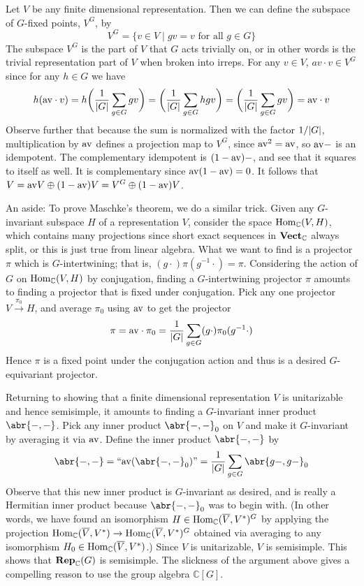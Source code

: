 \documentclass[../../rtnotes.tex]{subfiles}
\begin{document}
Let $V$ be any finite dimensional representation. Then we can define the subspace of $G$-fixed points, $V^G$, by
\[V^G = \{v\in V\mid gv = v\text{ for all }g\in G\}\]
The subspace $V^G$ is the part of $V$ that $G$ acts trivially on, or in other words is the trivial representation part of $V$ when broken into irreps. For any $v\in V$, $av\cdot v\in V^G$ since for any $h\in G$ we have
\[h(\mathrm{av}\cdot v) = h\biggl(\frac{1}{\abs{G}}\sum_{g\in G}gv\biggr) = \biggl(\frac{1}{\abs{G}}\sum_{g\in G}hgv\biggr) = \biggl(\frac{1}{\abs{G}}\sum_{g\in G}gv\biggr) = \mathrm{av}\cdot v\]
Observe further that because the sum is normalized with the factor $1/\abs{G}$, multiplication by $\mathrm{av}$ defines a projection map to $V^G$, since $\mathrm{av}^2 = \mathrm{av}$, so $\mathrm{av}-$ is an idempotent. The complementary idempotent is $(1-\mathrm{av})-$, and see that it squares to itself as well. It is complementary since $\mathrm{av}(1-\mathrm{av}) = 0$. It follows that $V = \mathrm{av} V\oplus (1-\mathrm{av})V = V^G\oplus (1-\mathrm{av})V$.

An aside: To prove Maschke's theorem, we do a similar trick. Given any $G$-invariant subspace $H$ of a representation $V$, consider the space $\operatorname{Hom}_{\mathbb C}(V,H)$, which contains many projections since short exact sequences in ${\normalfont\mathbf{Vect}}_{\mathbb C}$ always split, or this is just true from linear algebra. What we want to find is a projector $\pi$ which is $G$-intertwining; that is, $(g\cdot)\pi(g^{-1}\cdot) = \pi$. Considering the action of $G$ on $\operatorname{Hom}_{\mathbb C}(V,H)$ by conjugation, finding a $G$-intertwining projector $\pi$ amounts to finding a projector that is fixed under conjugation. Pick any one projector $V\xrightarrow{\pi_0}H$, and average $\pi_0$ using $\mathrm{av}$ to get the projector
\[\pi = \mathrm{av}\cdot\pi_0 = \frac{1}{\abs{G}}\sum_{g\in G}(g\cdot)\pi_0(g^{-1}\cdot)\]
Hence $\pi$ is a fixed point under the conjugation action and thus is a desired $G$-equivariant projector.

Returning to showing that a finite dimensional representation $V$ is unitarizable and hence semisimple, it amounts to finding a $G$-invariant inner product $\abr{-,-}$. Pick any inner product $\abr{-,-}_0$ on $V$ and make it $G$-invariant by averaging it via $\mathrm{av}$. Define the inner product $\abr{-,-}$ by 
\[\abr{-,-} = ``\av(\abr{-,-}_0)\textrm{''} = \frac{1}{\abs{G}}\sum_{g\in G}\abr{g-,g-}_0\]
Observe that this new inner product is $G$-invariant as desired, and is really a Hermitian inner product because $\abr{-,-}_0$ was to begin with. (In other words, we have found an isomorphism $H\in \operatorname{Hom}_{\mathbb C}(\overline V, V^\ast)^G$ by applying the projection $\operatorname{Hom}_{\mathbb C}(\overline V, V^\ast)\to \operatorname{Hom}_{\mathbb C}(\overline V, V^\ast)^G$ obtained via averaging to any isomorphism $H_0\in \operatorname{Hom}_{\mathbb C}(\overline V, V^\ast)$.) Since $V$ is unitarizable, $V$ is semisimple. This shows that ${\normalfont\mathbf{Rep}}_{\mathbb C}(G)$ is semisimple. The slickness of the argument above gives a compelling reason to use the group algebra $\mathbb C[G]$.
\end{document}
